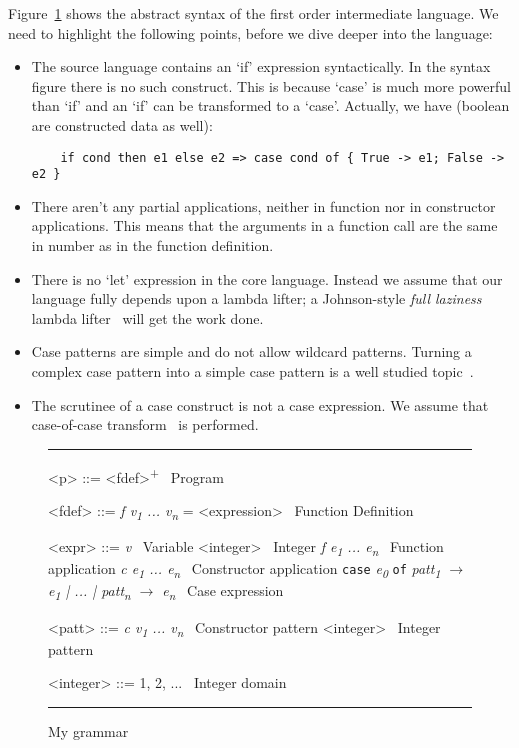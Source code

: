 \documentclass[diploma]{softlab-thesis}
\begin{document}
Figure~\ref{fig:grammar} shows the abstract syntax of 
the first order intermediate language.
We need to highlight the following points, before we dive deeper into the language:
\begin{itemize}
  \item The source language contains an `if' expression syntactically. In the syntax figure there is no such construct.
  This is because `case' is much more powerful than `if' and an `if' can be transformed to a `case'. 
  Actually, we have (boolean are constructed data as well):
  \begin{verbatim}
    if cond then e1 else e2 => case cond of { True -> e1; False -> e2 }
  \end{verbatim}
  \item There aren't any partial applications, neither in function nor in constructor applications.
  This means that the arguments in a function call are the same in number as in the function definition.
  \item There is no `let' expression in the core language. Instead we assume that our language 
  fully depends upon a lambda lifter; a Johnson-style \textit{full laziness} lambda lifter~\cite{Johnsson:1985:LLT:5280.5292}
  will get the work done.
  \item Case patterns are simple and do not allow wildcard patterns. Turning a complex case pattern into
  a simple case pattern is a well studied topic~\cite{Au85,Wadler87}.
  \item The scrutinee of a case construct is not a case expression. We assume that case-of-case 
  transform~\cite{Jone98} is performed.
\end{itemize}

\begin{figure}[t]
\hrule
\begin{grammar}
    <p> ::= <fdef>\textsuperscript{+} \hfill\ Program

    <fdef> ::= \textit{f v\textsubscript{1} ... v\textsubscript{n}} = <expression> \hfill\ Function Definition

    <expr> ::= \textit{v} \hfill\ Variable
    \alt <integer> \hfill\ Integer
    \alt \textit{f e\textsubscript{1} ... e\textsubscript{n}} \hfill\ Function application
    \alt \textit{c e\textsubscript{1} ... e\textsubscript{n}} \hfill\ Constructor application
    \alt \texttt{case} \textit{e\textsubscript{0}} \texttt{of} \textit{patt\textsubscript{1} $\rightarrow$ e\textsubscript{1} | ... | patt\textsubscript{n} $\rightarrow$ e\textsubscript{n}} \hfill\ Case expression
     
    <patt> ::= \textit{c v\textsubscript{1} ... v\textsubscript{n}} \hfill\ Constructor pattern
    \alt <integer> \hfill\ Integer pattern

    <integer> ::= 1, 2, ... \hfill\ Integer domain

\end{grammar}
\hrule
\caption{My grammar\label{fig:grammar}}
\end{figure}
\end{document}
